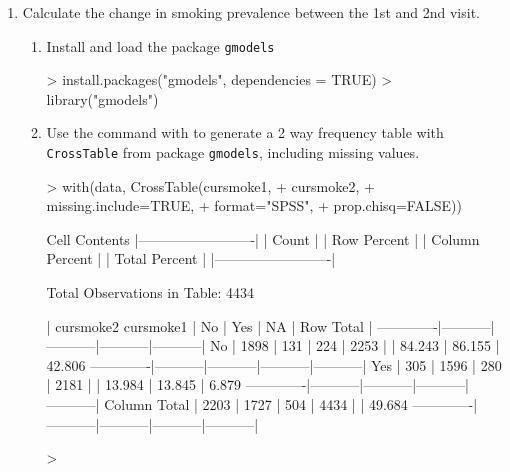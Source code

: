 \documentclass{article}
\begin{document}
\begin{enumerate}
\item Calculate the change in smoking prevalence between the 1st and 2nd visit.
\begin{enumerate}
  \item Install and load the package \texttt{gmodels}
\begin{Schunk}
\begin{Sinput}
> install.packages("gmodels", dependencies = TRUE)
> library("gmodels")
\end{Sinput}
\end{Schunk}
\pagebreak
\item Use the command with to generate a 2 way frequency table with \texttt{CrossTable} from package \texttt{gmodels}, including missing values.
\begin{Schunk}
\begin{Sinput}
> with(data, CrossTable(cursmoke1, 
+                       cursmoke2, 
+                       missing.include=TRUE, 
+                       format="SPSS",
+                       prop.chisq=FALSE))
\end{Sinput}
\begin{Soutput}
   Cell Contents
|-------------------------|
|                   Count |
|             Row Percent |
|          Column Percent |
|           Total Percent |
|-------------------------|

Total Observations in Table:  4434 

             | cursmoke2 
   cursmoke1 |       No  |      Yes  |       NA  | Row Total | 
-------------|-----------|-----------|-----------|-----------|
          No |     1898  |      131  |      224  |     2253  | 
             |   84.243% |    5.814% |    9.942% |   50.812% | 
             |   86.155% |    7.585% |   44.444% |           | 
             |   42.806% |    2.954% |    5.052% |           | 
-------------|-----------|-----------|-----------|-----------|
         Yes |      305  |     1596  |      280  |     2181  | 
             |   13.984% |   73.177% |   12.838% |   49.188% | 
             |   13.845% |   92.415% |   55.556% |           | 
             |    6.879% |   35.995% |    6.315% |           | 
-------------|-----------|-----------|-----------|-----------|
Column Total |     2203  |     1727  |      504  |     4434  | 
             |   49.684% |   38.949% |   11.367% |           | 
-------------|-----------|-----------|-----------|-----------|
\end{Soutput}
\begin{Sinput}
> 
\end{Sinput}
\end{Schunk}


\end{enumerate}
\end{enumerate}
\end{document}
